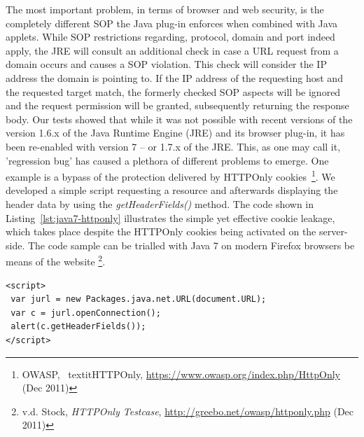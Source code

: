       The most important problem, in terms of browser and web security, is the completely different SOP the Java plug-in enforces when combined with Java applets. While SOP restrictions regarding, protocol, domain and port indeed apply, the JRE will consult an additional check in case a URL request from a domain occurs and causes a SOP violation. This check will consider the IP address the domain is pointing to. If the IP address of the requesting host and the requested target match, the formerly checked SOP aspects will be ignored and the request  permission will be granted, subsequently returning the response body. Our tests showed that while it was not possible with recent versions of the version 1.6.x of the Java Runtime Engine (JRE) and its browser plug-in, it has been re-enabled with version 7 -- or 1.7.x of the JRE. This, as one may call it, 'regression bug' has caused a plethora of different problems to emerge. One example is a bypass of the protection delivered by HTTPOnly cookies~\footnote{OWASP, \
textit{HTTPOnly}, \url{https://www.owasp.org/index.php/HttpOnly} (Dec 2011)}. We developed a simple script requesting a resource and afterwards displaying the header data by using the \textit{getHeaderFields()} method. The code shown in Listing~\ref{lst:java7-httponly} illustrates the simple yet effective cookie leakage, which takes place despite the HTTPOnly cookies being activated on the server-side. The code sample can be trialled with Java 7 on modern Firefox browsers be means of the website \footnote{v.d. Stock, \textit{HTTPOnly Testcase}, \url{http://greebo.net/owasp/httponly.php} (Dec 2011)}.

\begin{lstlisting}[captionpos=b,label=lst:java7-httponly,caption=Bypassing HTTPOnly with Java 7; The getHeaderFields() method extracts the sensitive data without considering httpOnly]
<script>
 var jurl = new Packages.java.net.URL(document.URL);
 var c = jurl.openConnection();
 alert(c.getHeaderFields());
</script>
\end{lstlisting}

